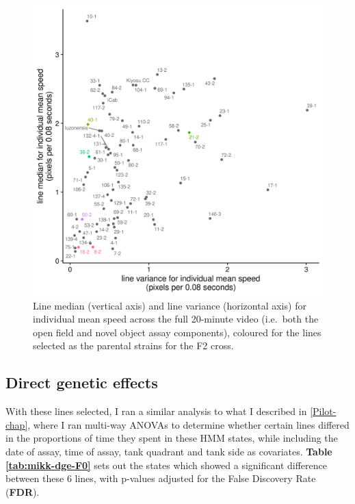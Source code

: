 \documentclass[
]{article}
\begin{document}
\begin{figure}
\includegraphics[width=1\linewidth]{figs/mikk_behaviour/line_mean_speed_variance_selected} \caption{Line median (vertical axis) and line variance (horizontal axis) for individual mean speed across the full 20-minute video (i.e.~both the open field and novel object assay components), coloured for the lines selected as the parental strains for the F2 cross.}\label{fig:F0-line-mean-speed-var-select}
\end{figure}

\hypertarget{direct-genetic-effects}{%
\subsection{Direct genetic effects}\label{direct-genetic-effects}}

With these lines selected, I ran a similar analysis to what I described in \ref{Pilot-chap}, where I ran multi-way ANOVAs to determine whether certain lines differed in the proportions of time they spent in these HMM states, while including the date of assay, time of assay, tank quadrant and tank side as covariates. \textbf{Table \ref{tab:mikk-dge-F0}} sets out the states which showed a significant difference between these 6 lines, with p-values adjusted for the False Discovery Rate (\textbf{FDR}).
\end{document}
